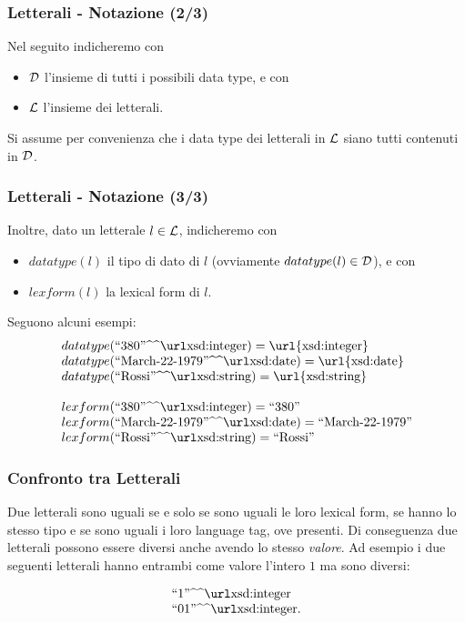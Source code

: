 \documentclass[8pt]{beamer}
\begin{document}
\begin{frame}
\frametitle{Letterali - Notazione (2/3)}
Nel seguito indicheremo con 
\begin{itemize}
  \item $\mathcal{D}$ l'insieme di tutti i possibili data type,
e con
  \item $\mathcal{L}$ l'insieme dei letterali.
\end{itemize}
\vspace{\baselineskip}

Si assume per convenienza 
che i data type dei letterali in $\mathcal{L}$ siano tutti 
contenuti in $\mathcal{D}$.
\end{frame}

\newcommand{\mathurl}[1]{\mbox{\url{#1}}}

\begin{frame}
\frametitle{Letterali - Notazione (3/3)}
Inoltre, dato un letterale $l \in \mathcal{L}$, indicheremo con
\begin{itemize}
 \item $datatype(l)$ il tipo di dato di $l$ (ovviamente $datatype(l) \in \mathcal{D}$), e con 
 \item $lexform(l)$ la lexical form di $l$.
\end{itemize}
\vspace{\baselineskip}

Seguono alcuni esempi:
\[
\begin{array}{l}
 datatype(\literal{380}{xsd:integer}) = \mathurl{xsd:integer}\\
 datatype(\literal{March-22-1979}{xsd:date}) = \mathurl{xsd:date}\\
 datatype(\literal{Rossi}{xsd:string}) = \mathurl{xsd:string}\\
 \\
 lexform(\literal{380}{xsd:integer}) = \stringLiteral{380}\\
 lexform(\literal{March-22-1979}{xsd:date}) = \stringLiteral{March-22-1979}\\
 lexform(\literal{Rossi}{xsd:string}) = \stringLiteral{Rossi} 
\end{array}
\]
\end{frame}


\begin{frame}
\frametitle{Confronto tra Letterali}
Due letterali sono uguali se e solo se sono uguali le loro lexical form,
se hanno lo stesso tipo e se sono uguali i loro language tag, ove presenti.
Di conseguenza due letterali possono essere diversi anche avendo lo stesso
\emph{valore}. Ad esempio i due seguenti letterali hanno entrambi 
come valore l'intero $1$ ma sono diversi:
\vspace{\baselineskip}

\[
 \begin{array}{l}
  \literal{1}{xsd:integer}\\
  \literal{01}{xsd:integer} .\\
 \end{array}
\]
\end{frame}
\end{document}

